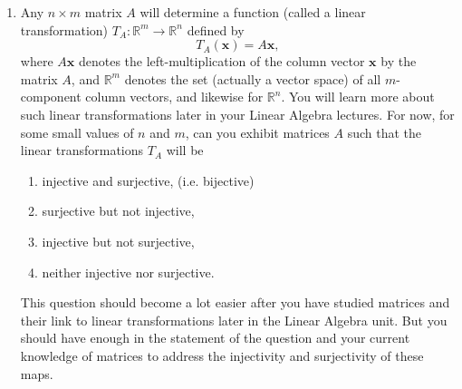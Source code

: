 \documentclass[oneside,10pt]{amsart}
\begin{document}
\begin{enumerate}
\begin{solution}
With these facts in mind we give example domains and co-domains
\begin{enumerate}
\item
injective and surjective, (i.e. bijective)
$$X = (-\pi/2, \pi/2), \quad Y=\mathbb{R},$$
\item
surjective but not injective,
$$X = (-\pi/2, \pi/2) \cup (\pi/2, 3\pi/2), \quad Y=\mathbb{R},$$
\item
injective but not surjective,
$$X=(0,\pi/2), \quad Y=\mathbb{R},$$
\item
neither injective nor surjective,
$$X=(0,\pi/2) \cup (\pi, 3\pi/2), \quad Y=\mathbb{R}.$$
\end{enumerate}

\end{solution}

\item
Any $n \times m$ matrix $A$ will determine a function (called a linear transformation) $T_A : \mathbb{R}^m \to \mathbb{R}^n$ defined by
$$T_A (\mathbf{x}) = A\mathbf{x} ,$$
where $A\mathbf{x}$ denotes the left-multiplication of the column vector $\mathbf{x}$ by the matrix $A$, and $\mathbb{R}^m$ denotes the set (actually a vector space) of all $m$-component column vectors, and likewise for $\mathbb{R}^n$. You will learn more about such linear transformations later in your Linear Algebra lectures. For now, for some small values of $n$ and $m$, can you exhibit matrices $A$ such that the linear transformations $T_A$ will be

\begin{enumerate}
\item
injective and surjective, (i.e. bijective)
\item
surjective but not injective,
\item
injective but not surjective,
\item
neither injective nor surjective.
\end{enumerate}
\begin{solution}
This question should become a lot easier after you have studied matrices and their link to linear transformations later in the Linear Algebra unit. But you should have enough in the statement of the question and your current knowledge of matrices to address the injectivity and surjectivity of these maps.


\end{solution}
\end{enumerate}
\end{document}

